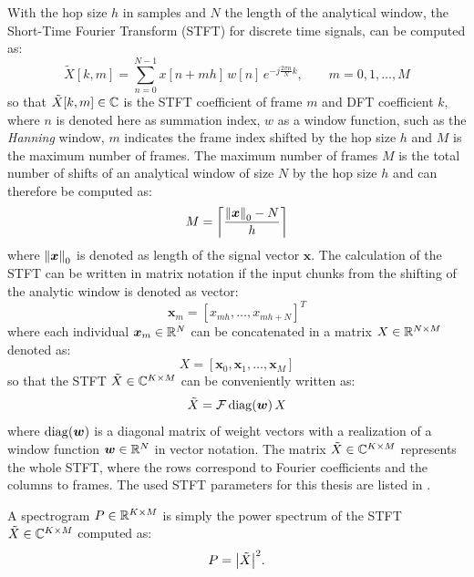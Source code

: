 With the hop size $h$ in samples and $N$ the length of the analytical window, the Short-Time Fourier Transform (STFT) for discrete time signals, can be computed as:
\begin{equation}\label{eq:signal_spec_stft}
    \tilde{X}[k, m] = \sum_{n=0}^{N-1} x[n + m h] \, w[n] \, e^{-j\frac{2 \pi n}{N}k}, \qquad m = 0, 1, \dots, M
\end{equation}
so that $\tilde{X}[k, m] \in \C$ is the STFT coefficient of frame $m$ and DFT coefficient $k$, where $n$ is denoted here as summation index, $w$ as a window function, such as the \emph{Hanning} window, $m$ indicates the frame index shifted by the hop size $h$ and $M$ is the maximum number of frames.
The maximum number of frames $M$ is the total number of shifts of an analytical window of size $N$ by the hop size $h$ and can therefore be computed as:
\begin{equation}\label{eq:signal_spec_hop}
  M = \ceil*{\frac{\norm{\bm{x}}_0-N}{h}}
\end{equation}
where $\norm{\bm{x}}_0$ is denoted as length of the signal vector $\bm{x}$.
The calculation of the STFT can be written in matrix notation if the input chunks from the shifting of the analytic window is denoted as vector:
\begin{equation}
  \bm{x}_m = [x_{m h}, \dots, x_{m h+N}]^T
\end{equation}
where each individual $\bm{x}_m \in \R^N$ can be concatenated in a matrix $X \in \R^{N \times M}$ denoted as:
\begin{equation}
  X = [\bm{x}_0, \bm{x}_1, \dots, \bm{x}_M]
\end{equation}
so that the STFT $\tilde{X} \in \C^{K \times M}$ can be conveniently written as:
\begin{equation}\label{eq:signal_spec_stft_matrix}
  \tilde{X} = \mathcal{F} \diag{\bm{w}} X
\end{equation}
where $\diag{\bm{w}}$ is a diagonal matrix of weight vectors with a realization of a window function $\bm{w} \in \R^N$ in vector notation.
The matrix $\tilde{X} \in \C^{K \times M}$ represents the whole STFT, where the rows correspond to Fourier coefficients and the columns to frames.
The used STFT parameters for this thesis are listed in .

A spectrogram $P \in \R^{K \times M}$ is simply the power spectrum of the STFT $\tilde{X} \in \C^{K \times M}$ computed as:
\begin{equation}\label{eq:signal_spec_spec}
  P = \abs{\tilde{X}}^2.
\end{equation}
